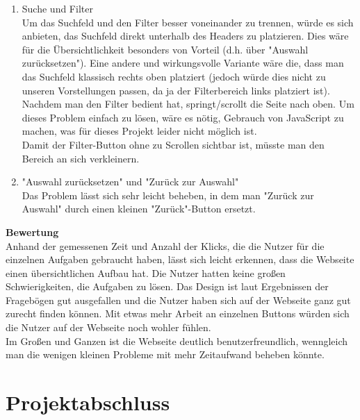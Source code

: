 \documentclass[parskip,10pt,abstracton]{scrartcl}
\begin{document}
\begin{enumerate}
\item Suche und Filter \\
Um das Suchfeld und den Filter besser voneinander zu trennen, würde es sich anbieten, das Suchfeld direkt unterhalb des Headers zu platzieren. Dies wäre für die Übersichtlichkeit besonders von Vorteil (d.h. über "Auswahl zurücksetzen"). Eine andere und wirkungsvolle Variante wäre die, dass man das Suchfeld klassisch rechts oben platziert (jedoch würde dies nicht zu unseren Vorstellungen passen, da ja der Filterbereich links platziert ist). \\
Nachdem man den Filter bedient hat, springt/scrollt die Seite nach oben. Um dieses Problem einfach zu lösen, wäre es nötig, Gebrauch von JavaScript zu machen, was für dieses Projekt leider nicht möglich ist.\\
Damit der Filter-Button ohne zu Scrollen sichtbar ist, müsste man den Bereich an sich verkleinern.\\    
\item "Auswahl zurücksetzen" und "Zurück zur Auswahl"\\
Das Problem lässt sich sehr leicht beheben, in dem man "Zurück zur Auswahl" durch einen kleinen "Zurück"-Button ersetzt. \\ 
\end{enumerate}
\textbf{Bewertung}\\
Anhand der gemessenen Zeit und Anzahl der Klicks, die die Nutzer für die einzelnen Aufgaben gebraucht haben, lässt sich leicht erkennen, dass die Webseite einen übersichtlichen Aufbau hat. Die Nutzer hatten keine großen Schwierigkeiten, die Aufgaben zu lösen. Das Design ist laut Ergebnissen der Fragebögen gut ausgefallen und die Nutzer haben sich auf der Webseite ganz gut zurecht finden können. Mit etwas mehr Arbeit an einzelnen Buttons würden sich die Nutzer auf der Webseite noch wohler fühlen.\\
Im Großen und Ganzen ist die Webseite deutlich benutzerfreundlich, wenngleich man die wenigen kleinen Probleme mit mehr Zeitaufwand beheben könnte. 
\section{Projektabschluss}
\end{document}
